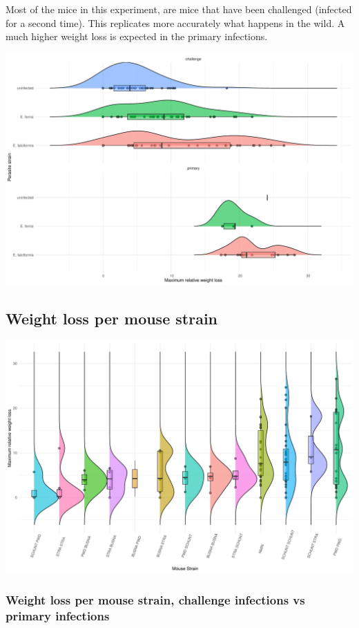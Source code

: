\documentclass[
]{article}
\begin{document}
Most of the mice in this experiment, are mice that have been challenged
(infected for a second time). This replicates more accurately what
happens in the wild. A much higher weight loss is expected in the
primary infections.

\includegraphics{Explorative_Stats_experimental_planning_files/figure-latex/general_WL_parasite_infection-1.pdf}

\subsection{Weight loss per mouse
strain}\label{weight-loss-per-mouse-strain}

\includegraphics{Explorative_Stats_experimental_planning_files/figure-latex/mouse_strain_WL-1.pdf}

\subsubsection{Weight loss per mouse strain, challenge infections vs
primary
infections}\label{weight-loss-per-mouse-strain-challenge-infections-vs-primary-infections}
\end{document}
